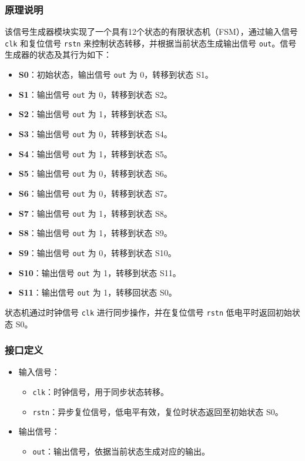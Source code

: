 \documentclass[zihao=5, UTF8]{article}
\theoremstyle{MyLineTheoremStyle} %
\theoremstyle{MyBlockTheoremStyle} %
\theoremstyle{MySubsubsectionStyle} %
\begin{document}
\subsubsection{原理说明}  
该信号生成器模块实现了一个具有12个状态的有限状态机（FSM），通过输入信号 \texttt{clk} 和复位信号 \texttt{rstn} 来控制状态转移，并根据当前状态生成输出信号 \texttt{out}。信号生成器的状态及其行为如下：  
\begin{itemize}  
    \item \textbf{S0}：初始状态，输出信号 \texttt{out} 为 0，转移到状态 S1。  
    \item \textbf{S1}：输出信号 \texttt{out} 为 0，转移到状态 S2。  
    \item \textbf{S2}：输出信号 \texttt{out} 为 1，转移到状态 S3。  
    \item \textbf{S3}：输出信号 \texttt{out} 为 0，转移到状态 S4。  
    \item \textbf{S4}：输出信号 \texttt{out} 为 1，转移到状态 S5。  
    \item \textbf{S5}：输出信号 \texttt{out} 为 0，转移到状态 S6。  
    \item \textbf{S6}：输出信号 \texttt{out} 为 0，转移到状态 S7。  
    \item \textbf{S7}：输出信号 \texttt{out} 为 1，转移到状态 S8。  
    \item \textbf{S8}：输出信号 \texttt{out} 为 1，转移到状态 S9。  
    \item \textbf{S9}：输出信号 \texttt{out} 为 0，转移到状态 S10。  
    \item \textbf{S10}：输出信号 \texttt{out} 为 1，转移到状态 S11。  
    \item \textbf{S11}：输出信号 \texttt{out} 为 1，转移回状态 S0。  
\end{itemize}  

状态机通过时钟信号 \texttt{clk} 进行同步操作，并在复位信号 \texttt{rstn} 低电平时返回初始状态 S0。  

\subsubsection{接口定义}  
\begin{itemize}  
    \item 输入信号：  
    \begin{itemize}  
        \item \texttt{clk}：时钟信号，用于同步状态转移。  
        \item \texttt{rstn}：异步复位信号，低电平有效，复位时状态返回至初始状态 S0。  
    \end{itemize}  
    \item 输出信号：  
    \begin{itemize}  
        \item \texttt{out}：输出信号，依据当前状态生成对应的输出。  
    \end{itemize}  
\end{itemize}  
\end{document}
